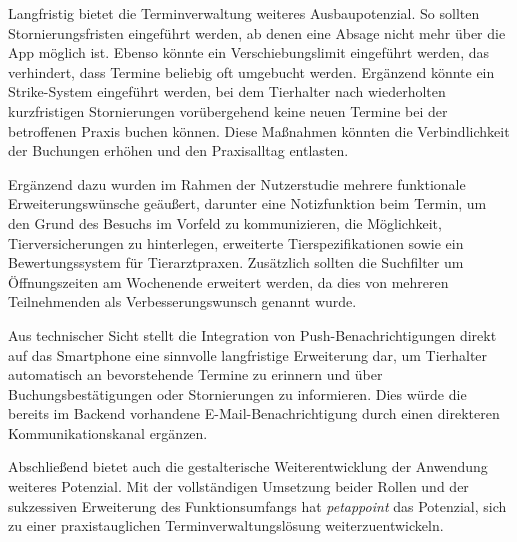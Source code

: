 Langfristig bietet die Terminverwaltung weiteres Ausbaupotenzial.
So sollten Stornierungsfristen eingeführt werden, ab denen eine
Absage nicht mehr über die App möglich ist. Ebenso könnte ein
Verschiebungslimit eingeführt werden, das verhindert, dass Termine
beliebig oft umgebucht werden. Ergänzend könnte ein Strike-System
eingeführt werden, bei dem Tierhalter nach wiederholten
kurzfristigen Stornierungen vorübergehend keine neuen Termine bei
der betroffenen Praxis buchen können. Diese Maßnahmen könnten die
Verbindlichkeit der Buchungen erhöhen und den Praxisalltag
entlasten.

Ergänzend dazu wurden im Rahmen der Nutzerstudie mehrere funktionale
Erweiterungswünsche geäußert, darunter eine Notizfunktion beim
Termin, um den Grund des Besuchs im Vorfeld zu kommunizieren, die
Möglichkeit, Tierversicherungen zu hinterlegen, erweiterte
Tierspezifikationen sowie ein Bewertungssystem für Tierarztpraxen.
Zusätzlich sollten die Suchfilter um Öffnungszeiten am Wochenende
erweitert werden, da dies von mehreren Teilnehmenden als
Verbesserungswunsch genannt wurde.

Aus technischer Sicht stellt die Integration von
Push-Benachrichtigungen direkt auf das Smartphone eine sinnvolle
langfristige Erweiterung dar, um Tierhalter automatisch an
bevorstehende Termine zu erinnern und über Buchungsbestätigungen
oder Stornierungen zu informieren. Dies würde die bereits im Backend
vorhandene E-Mail-Benachrichtigung durch einen direkteren
Kommunikationskanal ergänzen.

Abschließend bietet auch die gestalterische Weiterentwicklung der
Anwendung weiteres Potenzial. Mit der vollständigen Umsetzung beider
Rollen und der sukzessiven Erweiterung des Funktionsumfangs hat
\textit{petappoint} das Potenzial, sich zu einer praxistauglichen
Terminverwaltungslösung weiterzuentwickeln.